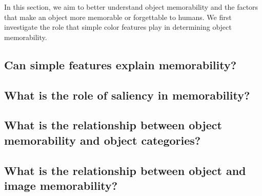 In this section, we aim to better understand object memorability and the factors that make an object more memorable or forgettable to humans. We first investigate the role that simple color features play in determining object memorability.

\subsection{Can simple features explain memorability?}



\subsection{What is the role of saliency in memorability?}



\subsection{What is the relationship between object memorability and object categories?}



\subsection{What is the relationship between object and image memorability?}

 